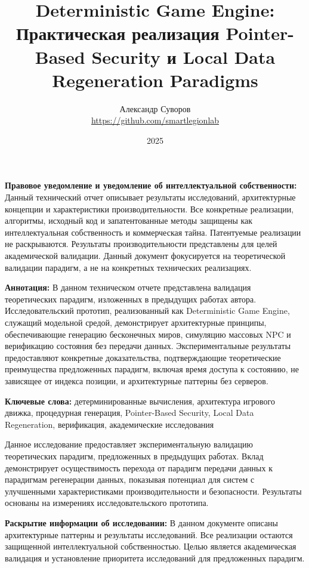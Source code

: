 \documentclass[14pt, a4paper]{extarticle}
\title{Deterministic Game Engine: Практическая реализация Pointer-Based Security и Local Data Regeneration Paradigms}
\author{Александр Суворов \\ \url{https://github.com/smartlegionlab}}
\date{2025}
\begin{document}
\maketitle

\begin{legalbox}
\textbf{Правовое уведомление и уведомление об интеллектуальной собственности:} Данный технический отчет описывает результаты исследований, архитектурные концепции и характеристики производительности. Все конкретные реализации, алгоритмы, исходный код и запатентованные методы защищены как интеллектуальная собственность и коммерческая тайна. Патентуемые реализации не раскрываются. Результаты производительности представлены для целей академической валидации. Данный документ фокусируется на теоретической валидации парадигм, а не на конкретных технических реализациях.
\end{legalbox}

\begin{summarybox}
\textbf{Аннотация:} В данном техническом отчете представлена валидация теоретических парадигм, изложенных в предыдущих работах автора. Исследовательский прототип, реализованный как Deterministic Game Engine, служащий модельной средой, демонстрирует архитектурные принципы, обеспечивающие генерацию бесконечных миров, симуляцию массовых NPC и верификацию состояния без передачи данных. Экспериментальные результаты предоставляют конкретные доказательства, подтверждающие теоретические преимущества предложенных парадигм, включая время доступа к состоянию, не зависящее от индекса позиции, и архитектурные паттерны без серверов.
\end{summarybox}

\textbf{Ключевые слова:} детерминированные вычисления, архитектура игрового движка, процедурная генерация, Pointer-Based Security, Local Data Regeneration, верификация, академические исследования

\begin{importantbox}
Данное исследование предоставляет экспериментальную валидацию теоретических парадигм, предложенных в предыдущих работах. Вклад демонстрирует осуществимость перехода от парадигм передачи данных к парадигмам регенерации данных, показывая потенциал для систем с улучшенными характеристиками производительности и безопасности. Результаты основаны на измерениях исследовательского прототипа.
\end{importantbox}

\begin{infobox}
\textbf{Раскрытие информации об исследовании:} В данном документе описаны архитектурные паттерны и результаты исследований. Все реализации остаются защищенной интеллектуальной собственностью. Целью является академическая валидация и установление приоритета исследований для предложенных парадигм.
\end{infobox}
\end{document}
